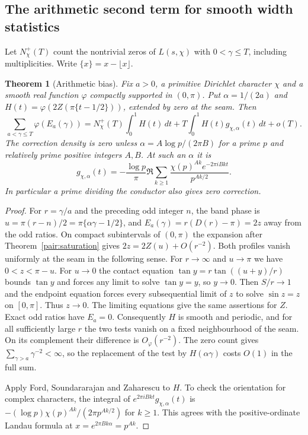 \documentclass[11pt,letterpaper]{article}
\newtheorem{theorem}{Theorem}[section]
\theoremstyle{remark}\newtheorem{remark}[theorem]{Remark}
\begin{document}
\subsection{The arithmetic second term for smooth width statistics}
Let $N_\chi^+(T)$ count the nontrivial zeros of $L(s,\chi)$ with
$0<\gamma\le T$, including multiplicities. Write $\{x\}=x-\lfloor x\rfloor$.
\begin{theorem}[Arithmetic bias]\label{arith:bias}
Fix $a>0$, a primitive Dirichlet character $\chi$ and a smooth real
function $\varphi$ compactly supported in $(0,\pi)$. Put
$\alpha=1/(2a)$ and $H(t)=\varphi(2Z(\pi\{t-1/2\}))$, extended by
zero at the seam. Then
\[
 \sum_{a<\gamma\le T}\varphi(E_a(\gamma))
 =N_\chi^+(T)\int_0^1 H(t)\,dt+
 T\int_0^1 H(t)g_{\chi,\alpha}(t)\,dt+o(T).
\]
The correction density is zero unless
$\alpha=A\log p/(2\pi B)$ for a prime $p$ and relatively prime positive
integers $A,B$. At such an $\alpha$ it is
\[
 g_{\chi,\alpha}(t)=-\frac{\log p}{\pi}\Re
 \sum_{k\ge1}\frac{\chi(p)^{Ak}e^{-2\pi i Bkt}}{p^{Ak/2}}.
\]
In particular a prime dividing the conductor also gives zero correction.
\end{theorem}
\begin{proof}
For $r=\gamma/a$ and the preceding odd integer $n$, the band phase is
$u=\pi(r-n)/2=\pi\{\alpha\gamma-1/2\}$, and
$E_a(\gamma)=r(D(r)-\pi)=2z$ away from the odd ratios.
On compact subintervals of $(0,\pi)$ the expansion after
Theorem~\ref{pair:saturation} gives $2z=2Z(u)+O(r^{-2})$.
Both profiles vanish uniformly at the seam in the following sense.
For $r\to\infty$ and $u\to\pi$ we have $0<z<\pi-u$. For $u\to0$ the
contact equation $\tan y=r\tan((u+y)/r)$ bounds $\tan y$ and forces any
limit to solve $\tan y=y$, so $y\to0$. Then $S/r\to1$ and the endpoint
equation forces every subsequential limit of $z$ to solve $\sin z=z$ on
$[0,\pi]$. Thus $z\to0$. The limiting equations give the same assertions
for $Z$. Exact odd ratios have $E_a=0$. Consequently $H$ is smooth and
periodic, and for all sufficiently large $r$ the two tests vanish on a
fixed neighbourhood of the seam. On its complement their difference
is $O_\varphi(r^{-2})$. The zero count gives
$\sum_{\gamma>a}\gamma^{-2}<\infty$, so the replacement of the test
by $H(\alpha\gamma)$ costs $O(1)$ in the full sum.

Apply Ford, Soundararajan and Zaharescu \cite[Theorem~5, formula (3.2)]{FSZ} to $H$. To check the orientation for complex characters,
the integral of $e^{2\pi i Bkt}g_{\chi,\alpha}(t)$ is
$-(\log p)\chi(p)^{Ak}/(2\pi p^{Ak/2})$ for $k\ge1$.
This agrees with the positive-ordinate Landau formula at
$x=e^{2\pi Bk\alpha}=p^{Ak}$.
\end{proof}
\end{document}
